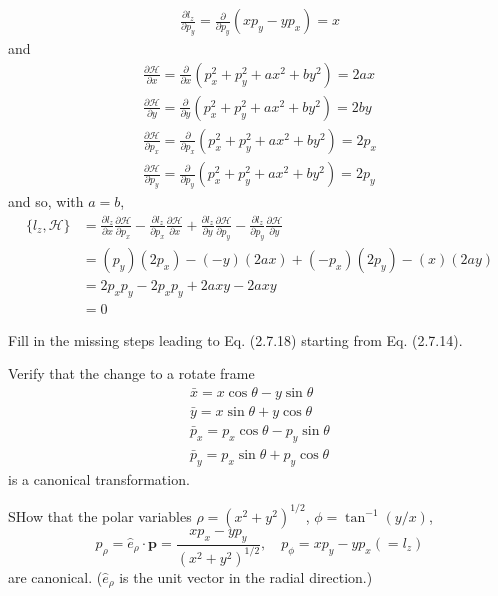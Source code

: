 \documentclass[../principles-of-quantum-mechanics.tex]{subfiles}
\begin{document}
\begin{questions}
\begin{solution}
\begin{gather*}
				\frac{\partial l_z}{\partial p_y} = \frac{\partial}{\partial p_y}(xp_y - yp_x) = x
			\end{gather*}
			and
			\begin{gather*}
				\frac{\partial \mathcal{H}}{\partial x} = \frac{\partial}{\partial x}(p_x^2 + p_y^2 + ax^2 + by^2) = 2ax \\
				\frac{\partial \mathcal{H}}{\partial y} = \frac{\partial}{\partial y}(p_x^2 + p_y^2 + ax^2 + by^2) = 2by \\
				\frac{\partial \mathcal{H}}{\partial p_x} = \frac{\partial}{\partial p_x}(p_x^2 + p_y^2 + ax^2 + by^2) = 2p_x \\
				\frac{\partial \mathcal{H}}{\partial p_y} = \frac{\partial}{\partial p_y}(p_x^2 + p_y^2 + ax^2 + by^2) = 2p_y
			\end{gather*}
			and so, with $a = b$,
			\begin{align*}
				\{l_z, \mathcal{H}\} &= \frac{\partial l_z}{\partial x}\frac{\partial\mathcal{H}}{\partial p_x} - \frac{\partial l_z}{\partial p_x}\frac{\partial\mathcal{H}}{\partial x} + \frac{\partial l_z}{\partial y}\frac{\partial\mathcal{H}}{\partial p_y} - \frac{\partial l_z}{\partial p_y}\frac{\partial\mathcal{H}}{\partial y} \\
				&= (p_y)(2p_x) - (-y)(2ax) + (-p_x)(2p_y) - (x)(2ay) \\
				&= 2p_xp_y - 2p_xp_y + 2axy - 2axy \\
				&= 0
			\end{align*}
		\end{solution}
	
		\question Fill in the missing steps leading to Eq. (2.7.18) starting from Eq. (2.7.14).
		
		\question Verify that the change to a rotate frame
		\begin{gather*}
			\bar{x} = x\cos\theta - y\sin\theta \\
			\bar{y} = x\sin\theta + y\cos\theta \\
			\bar{p}_x = p_x\cos\theta - p_y\sin\theta \\
			\bar{p}_y = p_x\sin\theta + p_y\cos\theta
		\end{gather*}
		is a canonical transformation.
		
		\question SHow that the polar variables $\rho = (x^2+y^2)^{1/2}$, $\phi = \tan^{-1}(y/x)$,
		\[
			p_\rho = \hat{e}_\rho\cdot\mathbf{p} = \frac{xp_x - yp_y}{(x^2 + y^2)^{1/2}}, \quad p_\phi = xp_y - yp_x (= l_z)
		\]
		are canonical. ($\hat{e}_\rho$ is the unit vector in the radial direction.)
		

\end{questions}
\end{document}
